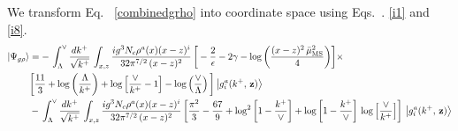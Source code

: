 \documentclass[aps,prd,amsmath,amssymb,nofootinbib]{revtex4-2}
\numberwithin{equation}{section}
\begin{document}
 We transform Eq.~ \eqref{combinedgrho} into coordinate space using Eqs.~. \eqref{i1} and \eqref{i8}.
 \begin{align}\label{grhoposition}
     \left|\Psi_{g\rho}\right\rangle & = -\,\int_{\Lambda}^{\vee}\frac{dk^{+}}{\sqrt{k^{+}}}\,\int_{x,z} \frac{ig^{3}N_{c}\rho^{a}(x)(x-z)^{i}}{32\pi^{7/2}\,(x-z)^{2}}\,\bigg[-\frac{2}{\epsilon}-2\gamma -\log{\left(\frac{(x-z)^{2}\,\Bar{\mu}_{\mathrm{MS}}^{2}}{4}\right)}\bigg]\times\notag \\ & \bigg[\frac{11}{3}+ \log{\left(\frac{\Lambda}{k^{+}}\right)}+\log{\left[\frac{\vee}{k^{+}}-1\right]}-\log\left(\frac{\vee}{\Lambda}\right)\bigg]\left|g_{i}^{a}(k^{+},\, \mathbf{z})\right\rangle \notag \\ & -\,\int_{\Lambda}^{\vee}\frac{dk^{+}}{\sqrt{k^{+}}}\,\int_{x,z} \frac{ig^{3}N_{c}\rho^{a}(x)(x-z)^{i}}{32\pi^{7/2}\,(x-z)^{2}}\,\bigg[\frac{\pi^{2}}{3} - \frac{67}{9} + \log^{2}{\left[1-\frac{k^{+}}{\vee}\right]}+\log{\left[1-\frac{k^{+}}{\vee}\right]}\,\log{\left[\frac{\vee}{k^{+}}\right]}\bigg]\, \left|g_{i}^{a}(k^{+},\, \mathbf{z})\right\rangle
\end{align}
\end{document}
